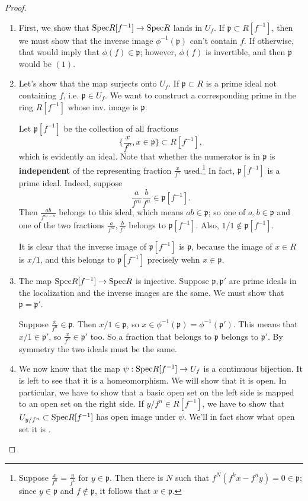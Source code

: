 \begin{proof} 
\begin{enumerate}
\item First, we show that $\mathrm{Spec} R[f^{-1}] \to \mathrm{Spec} R$ lands in $U_f$. If
$\mathfrak{p} \subset R[f^{-1}]$, then we must show that the inverse image
$\phi^{-1}(\mathfrak{p})$ can't contain $f$. If otherwise, that would imply that
$\phi(f) \in \mathfrak{p}$; however, $\phi(f)$ is invertible, and then
$\mathfrak{p}$ would be $(1)$.  
\item Let's show that the map surjects onto $U_f$. If $\mathfrak{p} \subset R$ is a prime
ideal not containing $f$, i.e. $\mathfrak{p} \in U_f$. We want to construct a
corresponding prime in the ring $R[f^{-1}]$ whose inv. image is $\mathfrak{p}$.

Let $\mathfrak{p}[f^{-1}]$ be the collection of all fractions
\[ \{\frac{x}{f^n}, x \in \mathfrak{p}\} \subset R[f^{-1}],  \]
which is evidently an ideal. Note that whether the numerator is in
$\mathfrak{p}$ is \textbf{independent} of the
representing fraction $\frac{x}{f^n}$ used.\footnote{Suppose $\frac{x}{f^n} =
\frac{y}{f^k}$ for $y \in \mathfrak{p}$. Then there is $N$ such that
$f^N(f^k x - f^n y) = 0 \in \mathfrak{p}$; since $y \in \mathfrak{p}$ and $f
\notin \mathfrak{p}$, it follows that $x \in \mathfrak{p}$.}
In fact, $\mathfrak{p}[f^{-1}]$ is a prime ideal. Indeed, suppose 
\[  \frac{a}{f^m} \frac{b}{f^n} \in \mathfrak{p}[f^{-1}] .\]
Then $\frac{ab}{f^{m+n}}$ belongs to this ideal, which means $ab \in
\mathfrak{p}$; so one of $a,b \in \mathfrak{p}$ and one of the two fractions
$\frac{a}{f^m}, \frac{b}{f^n}$ belongs to $\mathfrak{p}[f^{-1}]$. Also, $1/1
\notin \mathfrak{p}[f^{-1}]$.

It is clear that the inverse image of $\mathfrak{p}[f^{-1}]$ is $\mathfrak{p}$,
because the image of $x \in R$ is $x/1$, and this belongs to
$\mathfrak{p}[f^{-1}]$ precisely wehn $x \in \mathfrak{p}$.
\item The map $\mathrm{Spec} R[f^{-1}] \to \mathrm{Spec} R$ is injective. Suppose
$\mathfrak{p}, \mathfrak{p'}$ are prime ideals in the localization and the
inverse images are the same.  
We must show that $\mathfrak{p} = \mathfrak{p'}$.

Suppose $\frac{x}{f^n} \in \mathfrak{p}$.  Then $x/1 \in \mathfrak{p}$, so $x
\in \phi^{-1}(\mathfrak{p}) = \phi^{-1}(\mathfrak{p}')$.  This means that $x/1
\in \mathfrak{p}'$, so 
$\frac{x}{f^n} \in \mathfrak{p}'$ too.  So a fraction that belongs to
$\mathfrak{p}$ belongs to $\mathfrak{p}'$. By symmetry the two ideals must be
the same.  
\item We now know that the map $\psi: \mathrm{Spec} R[f^{-1}] \to U_f$ is a continuous
bijection. It is left to see that it is a homeomorphism.  We will show that it
is open.  
In particular, we have to show that a basic open set on the left side is mapped
to an open set on the right side.
If $y/f^n \in R[f^{-1}]$, we have to show that $U_{y/f^n} \subset \mathrm{Spec}
R[f^{-1}]$ has open image under $\psi$.  We'll in fact show what open set it is
.


\end{enumerate}
\end{proof}
